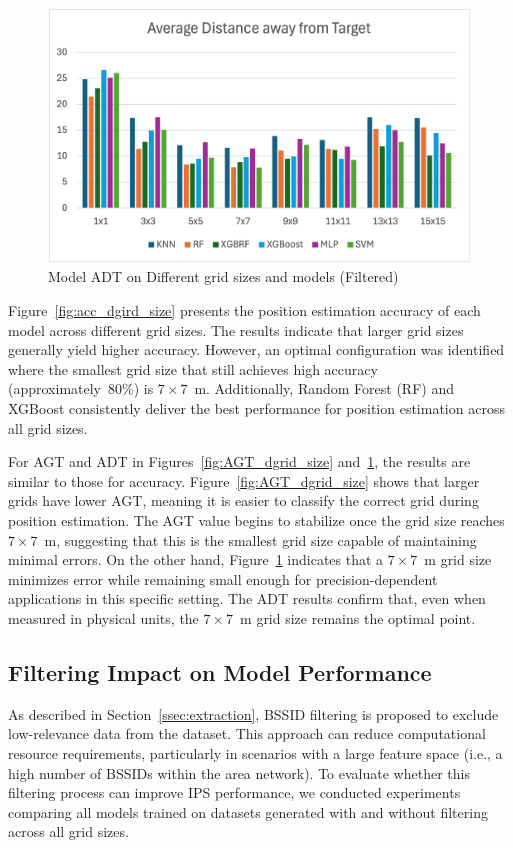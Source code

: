 \documentclass[runningheads]{llncs}
\begin{document}
\begin{figure}[thb!]
        \centering
        \includegraphics[width=.45\linewidth]{figures/overview_filtered_adt.png}
        \caption{Model ADT on Different grid sizes and models (Filtered)}
        \label{fig:ADT_dgrid_size}
\end{figure}

Figure~\ref{fig:acc_dgird_size} presents the position estimation accuracy of each model across different grid sizes. The results indicate that larger grid sizes generally yield higher accuracy. However, an optimal configuration was identified where the smallest grid size that still achieves high accuracy (approximately~80\%) is $7\times7$~m. Additionally, Random Forest (RF) and XGBoost consistently deliver the best performance for position estimation across all grid sizes.

For AGT and ADT in Figures~\ref{fig:AGT_dgrid_size} and~\ref{fig:ADT_dgrid_size}, the results are similar to those for accuracy. Figure~\ref{fig:AGT_dgrid_size} shows that larger grids have lower AGT, meaning it is easier to classify the correct grid during position estimation. The AGT value begins to stabilize once the grid size reaches $7\times7$~m, suggesting that this is the smallest grid size capable of maintaining minimal errors. On the other hand, Figure~\ref{fig:ADT_dgrid_size} indicates that a $7\times7$~m grid size minimizes error while remaining small enough for precision-dependent applications in this specific setting. The ADT results confirm that, even when measured in physical units, the $7\times7$~m grid size remains the optimal point.

\subsection{Filtering Impact on Model Performance}\label{ssec:filtering-impact}

As described in Section~\ref{ssec:extraction}, BSSID filtering is proposed to exclude low-relevance data from the dataset. This approach can reduce computational resource requirements, particularly in scenarios with a large feature space (i.e., a high number of BSSIDs within the area network). To evaluate whether this filtering process can improve IPS performance, we conducted experiments comparing all models trained on datasets generated with and without filtering across all grid sizes.
\end{document}

